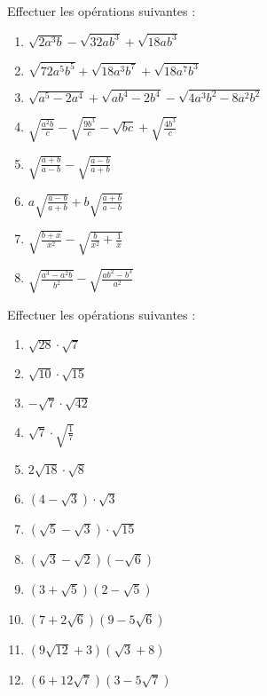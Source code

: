 \begin{exercice}
Effectuer les opérations suivantes :
\begin{multicols}{2}
\begin{enumerate}
\item $\sqrt{2{{a}^{3}}b}-\sqrt{32a{{b}^{3}}}+\sqrt{18a{{b}^{3}}}$
\item $\sqrt{72{{a}^{5}}{{b}^{5}}}+\sqrt{18{{a}^{3}}{{b}^{7}}}+\sqrt{18{{a}^{7}}{{b}^{3}}}$
\item $\sqrt{{{a}^{5}}-2{{a}^{4}}}+\sqrt{a{{b}^{4}}-2{{b}^{4}}}-\sqrt{4{{a}^{3}}{{b}^{2}}-8{{a}^{2}}{{b}^{2}}}$
\item $\sqrt{\frac{{{a}^{2}}b}{c}}-\sqrt{\frac{9{{b}^{3}}}{c}}-\sqrt{bc}+\sqrt{\frac{4{{b}^{3}}}{c}}$
\item $\sqrt{\frac{a+b}{a-b}}-\sqrt{\frac{a-b}{a+b}}$
\item $a\sqrt{\frac{a-b}{a+b}}+b\sqrt{\frac{a+b}{a-b}}$
\item $\sqrt{\frac{b+x}{{{x}^{2}}}}-\sqrt{\frac{b}{{{x}^{2}}}+\frac{1}{x}}$
\item $\sqrt{\frac{{{a}^{3}}-{{a}^{2}}b}{{{b}^{2}}}}-\sqrt{\frac{a{{b}^{2}}-{{b}^{3}}}{{{a}^{2}}}}$
\end{enumerate}
\end{multicols}
\end{exercice}

\begin{exercice}
Effectuer les opérations suivantes :
\begin{multicols}{2}
\begin{enumerate}
\item $\sqrt{28}\cdot \sqrt{7}$ 
\item $\sqrt{10}\cdot \sqrt{15}$ 
\item $-\sqrt{7}\cdot \sqrt{42}$ 
\item $\sqrt{7}\cdot \sqrt{\frac{1}{7}}$ 
\item $2\sqrt{18}\cdot \sqrt{8}$
\item $\left( 4-\sqrt{3} \right)\cdot \sqrt{3}$
\item $\left( \sqrt{5}-\sqrt{3} \right)\cdot \sqrt{15}$
\item $\left( \sqrt{3}-\sqrt{2} \right)\left( -\sqrt{6} \right)$
\item $\left( 3+\sqrt{5} \right)\left( 2-\sqrt{5} \right)$
\item $\left( 7+2\sqrt{6} \right)\left( 9-5\sqrt{6} \right)$
\item $\left( 9\sqrt{12}+3 \right)\left( \sqrt{3}+8 \right)$
\item $\left( 6+12\sqrt{7} \right)\left( 3-5\sqrt{7} \right)$
\end{enumerate}
\end{multicols}
\end{exercice}

